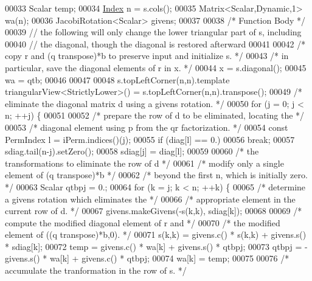 \begin{DoxyCode}
00033     Scalar temp;
00034     \hyperlink{namespace_eigen_a62e77e0933482dafde8fe197d9a2cfde}{Index} n = s.cols();
00035     Matrix<Scalar,Dynamic,1>  wa(n);
00036     JacobiRotation<Scalar> givens;
00037 
00038     \textcolor{comment}{/* Function Body */}
00039     \textcolor{comment}{// the following will only change the lower triangular part of s, including}
00040     \textcolor{comment}{// the diagonal, though the diagonal is restored afterward}
00041 
00042     \textcolor{comment}{/*     copy r and (q transpose)*b to preserve input and initialize s. */}
00043     \textcolor{comment}{/*     in particular, save the diagonal elements of r in x. */}
00044     x = s.diagonal();
00045     wa = qtb;
00046     
00047    
00048     s.topLeftCorner(n,n).template triangularView<StrictlyLower>() = s.topLeftCorner(n,n).transpose();
00049     \textcolor{comment}{/*     eliminate the diagonal matrix d using a givens rotation. */}
00050     \textcolor{keywordflow}{for} (j = 0; j < n; ++j) \{
00051 
00052         \textcolor{comment}{/*        prepare the row of d to be eliminated, locating the */}
00053         \textcolor{comment}{/*        diagonal element using p from the qr factorization. */}
00054         \textcolor{keyword}{const} PermIndex l = iPerm.indices()(j);
00055         \textcolor{keywordflow}{if} (diag[l] == 0.)
00056             \textcolor{keywordflow}{break};
00057         sdiag.tail(n-j).setZero();
00058         sdiag[j] = diag[l];
00059 
00060         \textcolor{comment}{/*        the transformations to eliminate the row of d */}
00061         \textcolor{comment}{/*        modify only a single element of (q transpose)*b */}
00062         \textcolor{comment}{/*        beyond the first n, which is initially zero. */}
00063         Scalar qtbpj = 0.;
00064         \textcolor{keywordflow}{for} (k = j; k < n; ++k) \{
00065             \textcolor{comment}{/*           determine a givens rotation which eliminates the */}
00066             \textcolor{comment}{/*           appropriate element in the current row of d. */}
00067             givens.makeGivens(-s(k,k), sdiag[k]);
00068 
00069             \textcolor{comment}{/*           compute the modified diagonal element of r and */}
00070             \textcolor{comment}{/*           the modified element of ((q transpose)*b,0). */}
00071             s(k,k) = givens.c() * s(k,k) + givens.s() * sdiag[k];
00072             temp = givens.c() * wa[k] + givens.s() * qtbpj;
00073             qtbpj = -givens.s() * wa[k] + givens.c() * qtbpj;
00074             wa[k] = temp;
00075 
00076             \textcolor{comment}{/*           accumulate the tranformation in the row of s. */}

\end{DoxyCode}
